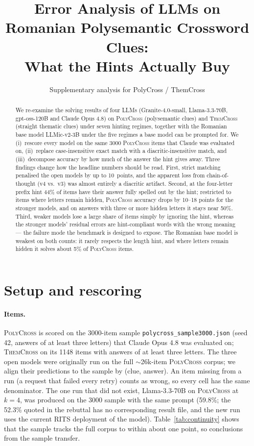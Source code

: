\documentclass{article}
\title{Error Analysis of LLMs on Romanian Polysemantic Crossword Clues:\\
What the Hints Actually Buy}
\author{Supplementary analysis for PolyCross / ThemCross}
\newcommand{\poly}{\textsc{PolyCross}}
\newcommand{\them}{\textsc{ThemCross}}
\begin{document}
\maketitle

\begin{abstract}
We re-examine the solving results of four LLMs (Granite-4.0-small, Llama-3.3-70B, gpt-oss-120B and
Claude Opus 4.8) on \poly{} (polysemantic clues) and \them{} (straight thematic clues) under seven
hinting regimes, together with the Romanian base model LLMic-v2-3B under the five regimes a base
model can be prompted for. We (i)~rescore every model on the same 3000 \poly{} items that Claude was
evaluated on, (ii)~replace case-insensitive exact match with a diacritic-insensitive match, and
(iii)~decompose accuracy by how much of the answer the hint gives away. Three findings change how
the headline numbers should be read. First, strict matching penalised the open models by up to
10~points, and the apparent loss from chain-of-thought (v4 vs.\ v3) was almost entirely a diacritic
artifact. Second, at the four-letter prefix hint 44\% of items have their answer fully spelled out by
the hint; restricted to items where letters remain hidden, \poly{} accuracy drops by 10--18 points
for the stronger models, and on answers with three or more hidden letters it stays near 50\%.
Third, weaker models lose a large share of items simply by ignoring the hint, whereas the stronger
models' residual errors are hint-compliant words with the wrong meaning --- the failure mode the
benchmark is designed to expose. The Romanian base model is weakest on both counts: it rarely
respects the length hint, and where letters remain hidden it solves about 5\% of \poly{} items.
\end{abstract}

\section{Setup and rescoring}
\label{sec:setup}

\paragraph{Items.} \poly{} is scored on the 3000-item sample \texttt{polycross\_sample3000.json}
(seed 42, answers of at least three letters) that Claude Opus 4.8 was evaluated on; \them{} on its
1148 items with answers of at least three letters. The three open models were originally run on the
full $\sim$26k-item \poly{} corpus; we align their predictions to the sample by (clue, answer). An item
missing from a run (a request that failed every retry) counts as wrong, so every cell has the same
denominator. The one run that did not exist, Llama-3.3-70B on \poly{} at $k{=}4$, was produced on
the 3000 sample with the same prompt (59.8\%; the 52.3\% quoted in the rebuttal has no
corresponding result file, and the new run uses the current RITS deployment of the model). Table~\ref{tab:continuity} shows that the sample tracks the
full corpus to within about one point, so conclusions from the sample transfer.
\end{document}
